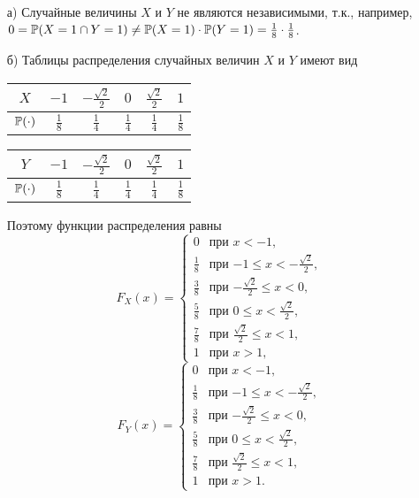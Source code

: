 \begin{enumerate}
\begin{enumerate}
\item[а)] Случайные величины $X$ и $Y$ не являются независимыми, т.к., например, $0 = \P(X=1 \cap Y=1) \not= \P(X=1) \cdot \P(Y=1) = \frac{1}{8} \cdot \frac{1}{8}$.

\item[б)] Таблицы распределения случайных величин $X$ и $Y$ имеют вид

\begin{tabular}{@{}cccccc@{}}
\toprule
$X$         & $-1$   & $-\frac{\sqrt{2}}{2}$   & $0$ & $ \frac{\sqrt{2}}{2}$ & $1$ \\ \midrule
$\P(\cdot)$ & $\frac{1}{8}$ & $\frac{1}{4}$ & $\frac{1}{4}$ & $\frac{1}{4}$ & $\frac{1}{8}$ \\ \bottomrule
\end{tabular}
\hspace{1cm}
\begin{tabular}{@{}cccccc@{}}
\toprule
$Y$         & $-1$   & $-\frac{\sqrt{2}}{2}$   & $0$ & $ \frac{\sqrt{2}}{2}$ & $1$ \\ \midrule
$\P(\cdot)$ & $\frac{1}{8}$ & $\frac{1}{4}$ & $\frac{1}{4}$ & $\frac{1}{4}$ & $\frac{1}{8}$ \\ \bottomrule
\end{tabular}


Поэтому функции распределения равны
\[
F_X(x) =
                 \begin{cases}
                     0                           &   \text{при $x < -1$,} \\
                     \frac{1}{8}                 &   \text{при $-1 \leq x < -\frac{\sqrt{2}}{2}$,} \\
                     \frac{3}{8}                 &   \text{при $-\frac{\sqrt{2}}{2} \leq x < 0$,} \\
                     \frac{5}{8}                 &   \text{при $0 \leq x < \frac{\sqrt{2}}{2}$,} \\
                     \frac{7}{8}                 &   \text{при $\frac{\sqrt{2}}{2} \leq x < 1$,} \\
                     1                           &   \text{при $x > 1$,}
                  \end{cases}
\]
\[
F_Y(x) =
                 \begin{cases}
                     0                           &   \text{при $x < -1$,} \\
                     \frac{1}{8}                 &   \text{при $-1 \leq x < -\frac{\sqrt{2}}{2}$,} \\
                     \frac{3}{8}                 &   \text{при $-\frac{\sqrt{2}}{2} \leq x < 0$,} \\
                     \frac{5}{8}                 &   \text{при $0 \leq x < \frac{\sqrt{2}}{2}$,} \\
                     \frac{7}{8}                 &   \text{при $\frac{\sqrt{2}}{2} \leq x < 1$,} \\
                     1                           &   \text{при $x > 1$.}
                  \end{cases}
\]


\end{enumerate}
\end{enumerate}
